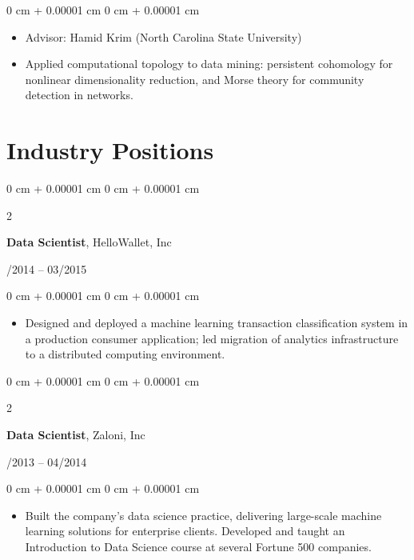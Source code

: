 \documentclass[10pt, letterpaper]{article}
\newenvironment{highlights}{
    \begin{itemize}[
        topsep=0.10 cm,
        parsep=0.10 cm,
        partopsep=0pt,
        itemsep=0pt,
        leftmargin=0 cm + 10pt
    ]
}{
    \end{itemize}
} %
\newenvironment{onecolentry}{
    \begin{adjustwidth}{
        0 cm + 0.00001 cm
    }{
        0 cm + 0.00001 cm
    }
}{
    \end{adjustwidth}
} %
\newenvironment{twocolentry}[2][]{
    \onecolentry
    \def\secondColumn{#2}
    \setcolumnwidth{\fill, 4.5 cm}
    \begin{paracol}{2}
}{
    \switchcolumn \raggedleft \secondColumn
    \end{paracol}
    \endonecolentry
} %
\begin{document}
        \vspace{0.10 cm}
        \begin{onecolentry}
            \begin{highlights}
                \item Advisor: Hamid Krim (North Carolina State University)
                \item Applied computational topology to data mining: persistent cohomology for nonlinear dimensionality reduction, and Morse theory for community detection in networks.
            \end{highlights}
        \end{onecolentry}


        \vspace{0.20 cm}








\section{Industry Positions}

        \begin{twocolentry}{
            04/2014 – 03/2015
        }
            \textbf{Data Scientist}, HelloWallet, Inc
            \end{twocolentry}

        \vspace{0.10 cm}
        \begin{onecolentry}
            \begin{highlights}
                \item Designed and deployed a machine learning transaction classification system in a production consumer application; led migration of analytics infrastructure to a distributed computing environment.
            \end{highlights}
        \end{onecolentry}

        \vspace{0.20 cm}

        \begin{twocolentry}{
            08/2013 – 04/2014
        }
            \textbf{Data Scientist}, Zaloni, Inc
            \end{twocolentry}

        \vspace{0.10 cm}
        \begin{onecolentry}
            \begin{highlights}
                \item Built the company's data science practice, delivering large-scale machine learning solutions for enterprise clients. Developed and taught an Introduction to Data Science course at several Fortune 500 companies.
            \end{highlights}
        \end{onecolentry}
\end{document}
